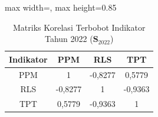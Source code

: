\begin{table}[H]
\centering
\caption{Matriks Korelasi Terbobot Indikator Tahun 2022 ($\mathbf{S}_{2022}$)} \label{tab:sample1matriks_intra_loading_2022}
\begin{adjustbox}{max width=\textwidth, max height=0.85\textheight}
\begin{tabular}{|c|c|c|c|}
\hline
\textbf{Indikator} & \textbf{PPM} & \textbf{RLS} & \textbf{TPT} \\
\hline
PPM & 1 & -0,8277 & 0,5779 \\
RLS & -0,8277 & 1 & -0,9363 \\
TPT & 0,5779 & -0,9363 & 1 \\
\hline
\end{tabular}
\end{adjustbox}
\end{table}